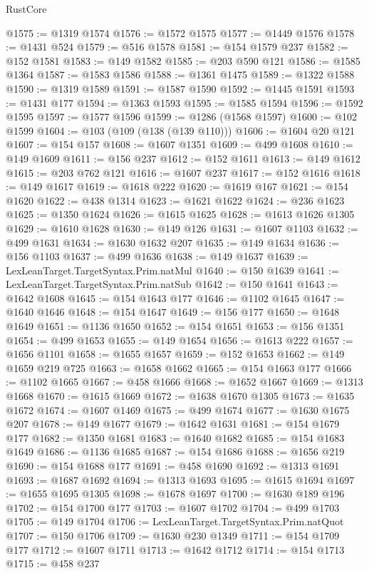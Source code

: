 \begin{lexlean}{RustCore}
\begin{coremodule}
@1575 := @1319 @1574
@1576 := @1572 @1575
@1577 := @1449 @1576
@1578 := @1431 @524
@1579 := @516 @1578
@1581 := @154 @1579 @237
@1582 := @152 @1581
@1583 := @149 @1582
@1585 := @203 @590 @121
@1586 := @1585 @1364
@1587 := @1583 @1586
@1588 := @1361 @1475
@1589 := @1322 @1588
@1590 := @1319 @1589
@1591 := @1587 @1590
@1592 := @1445 @1591
@1593 := @1431 @177
@1594 := @1363 @1593
@1595 := @1585 @1594
@1596 := @1592 @1595
@1597 := @1577 @1596
@1599 := @1286 (@1568 @1597)
@1600 := @102 @1599
@1604 := @103 (@109 (@138 (@139 @110)))
@1606 := @1604 @20 @121
@1607 := @154 @157
@1608 := @1607 @1351
@1609 := @499 @1608
@1610 := @149 @1609
@1611 := @156 @237
@1612 := @152 @1611
@1613 := @149 @1612
@1615 := @203 @762 @121
@1616 := @1607 @237
@1617 := @152 @1616
@1618 := @149 @1617
@1619 := @1618 @222
@1620 := @1619 @167
@1621 := @154 @1620
@1622 := @438 @1314
@1623 := @1621 @1622
@1624 := @236 @1623
@1625 := @1350 @1624
@1626 := @1615 @1625
@1628 := @1613 @1626 @1305
@1629 := @1610 @1628
@1630 := @149 @126
@1631 := @1607 @1103
@1632 := @499 @1631
@1634 := @1630 @1632 @207
@1635 := @149 @1634
@1636 := @156 @1103
@1637 := @499 @1636
@1638 := @149 @1637
@1639 := LexLeanTarget.TargetSyntax.Prim.natMul
@1640 := @150 @1639
@1641 := LexLeanTarget.TargetSyntax.Prim.natSub
@1642 := @150 @1641
@1643 := @1642 @1608
@1645 := @154 @1643 @177
@1646 := @1102 @1645
@1647 := @1640 @1646
@1648 := @154 @1647
@1649 := @156 @177
@1650 := @1648 @1649
@1651 := @1136 @1650
@1652 := @154 @1651
@1653 := @156 @1351
@1654 := @499 @1653
@1655 := @149 @1654
@1656 := @1613 @222
@1657 := @1656 @1101
@1658 := @1655 @1657
@1659 := @152 @1653
@1662 := @149 @1659 @219 @725
@1663 := @1658 @1662
@1665 := @154 @1663 @177
@1666 := @1102 @1665
@1667 := @458 @1666
@1668 := @1652 @1667
@1669 := @1313 @1668
@1670 := @1615 @1669
@1672 := @1638 @1670 @1305
@1673 := @1635 @1672
@1674 := @1607 @1469
@1675 := @499 @1674
@1677 := @1630 @1675 @207
@1678 := @149 @1677
@1679 := @1642 @1631
@1681 := @154 @1679 @177
@1682 := @1350 @1681
@1683 := @1640 @1682
@1685 := @154 @1683 @1649
@1686 := @1136 @1685
@1687 := @154 @1686
@1688 := @1656 @219
@1690 := @154 @1688 @177
@1691 := @458 @1690
@1692 := @1313 @1691
@1693 := @1687 @1692
@1694 := @1313 @1693
@1695 := @1615 @1694
@1697 := @1655 @1695 @1305
@1698 := @1678 @1697
@1700 := @1630 @189 @196
@1702 := @154 @1700 @177
@1703 := @1607 @1702
@1704 := @499 @1703
@1705 := @149 @1704
@1706 := LexLeanTarget.TargetSyntax.Prim.natQuot
@1707 := @150 @1706
@1709 := @1630 @230 @1349
@1711 := @154 @1709 @177
@1712 := @1607 @1711
@1713 := @1642 @1712
@1714 := @154 @1713
@1715 := @458 @237

\end{coremodule}
\end{lexlean}
